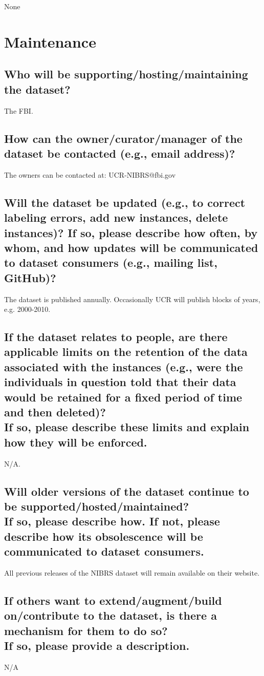 \documentclass[letterpaper, 10 pt, conference]{ieeeconf}  %
\newcommand{\subtitle}[1]{{\\ \small \normalfont \color{purple} #1}}
\begin{document}
None

\section{Maintenance}

\subsection{Who will be supporting/hosting/maintaining the dataset?}

The FBI.

\subsection{How can the owner/curator/manager of the dataset be contacted (e.g., email address)?}

The owners can be contacted at: UCR-NIBRS@fbi.gov

\subsection{Will the dataset be updated (e.g., to correct labeling errors, add new instances, delete instances)? If so, please describe how often, by whom, and how updates will be communicated to dataset consumers (e.g., mailing list, GitHub)?}

The dataset is published annually. Occasionally UCR will publish blocks of years, e.g. 2000-2010.

\subsection{If the dataset relates to people, are there applicable limits on the retention of the data associated with the instances (e.g., were the individuals in question told that their data would be retained for a fixed period of time and then deleted)? \subtitle{If so, please describe these limits and explain how they will be enforced.}}

N/A.

\subsection{Will older versions of the dataset continue to be supported/hosted/maintained? \subtitle{If so, please describe how. If not, please describe how its obsolescence will be communicated to dataset consumers. }}

All previous releases of the NIBRS dataset will remain available on their website.

\subsection{If others want to extend/augment/build on/contribute to the dataset, is there a mechanism for them to do so? \subtitle{If so, please provide a description.}}

N/A

\medskip
 
  

\end{document}
